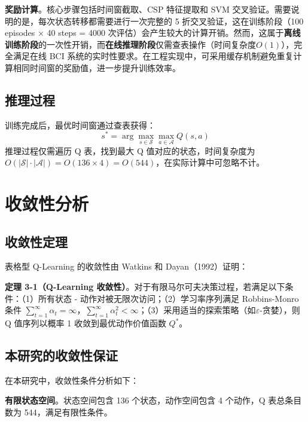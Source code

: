 \textbf{奖励计算}。核心步骤包括时间窗截取、CSP 特征提取和 SVM 交叉验证。需要说明的是，每次状态转移都需要进行一次完整的 5 折交叉验证，这在训练阶段（100 episodes × 40 steps = 4000 次评估）会产生较大的计算开销。然而，这属于\textbf{离线训练阶段}的一次性开销，而\textbf{在线推理阶段}仅需查表操作（时间复杂度$O(1)$），完全满足在线 BCI 系统的实时性要求。在工程实现中，可采用缓存机制避免重复计算相同时间窗的奖励值，进一步提升训练效率。


\subsection{推理过程}
\label{subsec:inference}

训练完成后，最优时间窗通过查表获得：
\begin{equation}
s^* = \arg\max_{s \in \mathcal{S}} \max_{a \in \mathcal{A}} Q(s, a)
\end{equation}
推理过程仅需遍历 Q 表，找到最大 Q 值对应的状态，时间复杂度为 $O(|\mathcal{S}| \cdot |\mathcal{A}|) = O(136 \times 4) = O(544)$，在实际计算中可忽略不计。

\section{收敛性分析}
\label{sec:convergence}

\subsection{收敛性定理}
\label{subsec:theorem}

表格型 Q-Learning 的收敛性由 Watkins 和 Dayan（1992）证明\cite{watkins1992q}：

\textbf{定理 3-1（Q-Learning 收敛性）}。对于有限马尔可夫决策过程，若满足以下条件：（1）所有状态 - 动作对被无限次访问；（2）学习率序列满足 Robbins-Monro 条件 $\sum_{t=1}^{\infty} \alpha_t = \infty$，$\sum_{t=1}^{\infty} \alpha_t^2 < \infty$；（3）采用适当的探索策略（如$\varepsilon$-贪婪），则 Q 值序列以概率 1 收敛到最优动作价值函数 $Q^*$。

\subsection{本研究的收敛性保证}
\label{subsec:convergence_guarantee}

在本研究中，收敛性条件分析如下：

\textbf{有限状态空间}。状态空间包含 136 个状态，动作空间包含 4 个动作，Q 表总条目数为 544，满足有限性条件。

